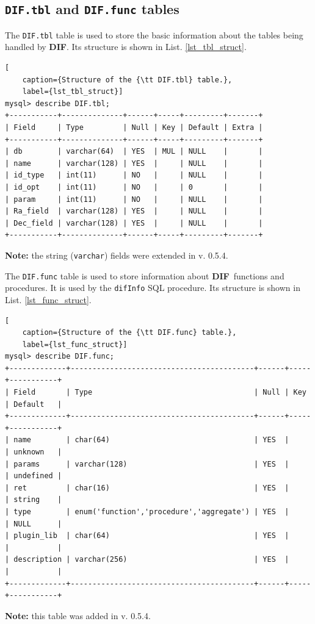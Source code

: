 \documentclass[10pt,titlepage]{article}
\newcommand{\dif}{\textbf{\small DIF}}
\begin{document}
\subsection{\texttt{DIF.tbl} and \texttt{DIF.func} tables}
The {\tt DIF.tbl} table is used to store the basic information about the
tables being handled by \dif.
Its structure is shown in List. \ref{lst_tbl_struct}.
\begin{lstlisting}[
    caption={Structure of the {\tt DIF.tbl} table.},
    label={lst_tbl_struct}]
mysql> describe DIF.tbl;
+-----------+--------------+------+-----+---------+-------+
| Field     | Type         | Null | Key | Default | Extra |
+-----------+--------------+------+-----+---------+-------+
| db        | varchar(64)  | YES  | MUL | NULL    |       |
| name      | varchar(128) | YES  |     | NULL    |       |
| id_type   | int(11)      | NO   |     | NULL    |       |
| id_opt    | int(11)      | NO   |     | 0       |       |
| param     | int(11)      | NO   |     | NULL    |       |
| Ra_field  | varchar(128) | YES  |     | NULL    |       |
| Dec_field | varchar(128) | YES  |     | NULL    |       |
+-----------+--------------+------+-----+---------+-------+
\end{lstlisting}
\textbf{Note:} the string (\texttt{varchar}) fields were extended in v. 0.5.4.

\medskip
The {\tt DIF.func} table is used to store information about \dif\ functions
and procedures. It is used by the \texttt{difInfo} SQL procedure.
Its structure is shown in List. \ref{lst_func_struct}.
\begin{lstlisting}[
    caption={Structure of the {\tt DIF.func} table.},
    label={lst_func_struct}]
mysql> describe DIF.func;
+-------------+------------------------------------------+------+-----+-----------+
| Field       | Type                                     | Null | Key | Default   |
+-------------+------------------------------------------+------+-----+-----------+
| name        | char(64)                                 | YES  |     | unknown   |
| params      | varchar(128)                             | YES  |     | undefined |
| ret         | char(16)                                 | YES  |     | string    |
| type        | enum('function','procedure','aggregate') | YES  |     | NULL      |
| plugin_lib  | char(64)                                 | YES  |     |           |
| description | varchar(256)                             | YES  |     |           |
+-------------+------------------------------------------+------+-----+-----------+
\end{lstlisting}
\textbf{Note:} this table was added in v. 0.5.4.
\end{document}
